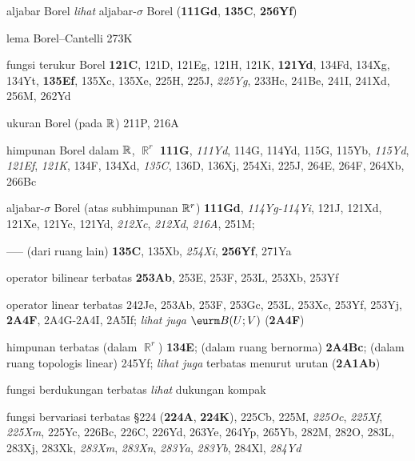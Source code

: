  aljabar Borel {\it lihat} aljabar-$\sigma$ Borel ({\bf 111Gd}, {\bf 135C}, {\bf 256Yf}) 





lema Borel--Cantelli 273K


















fungsi terukur Borel {\bf 121C}, 121D, 121Eg, 121H, 121K, {\bf 121Yd}, 134Fd, 134Xg, 134Yt, {\bf 135Ef}, 135Xc, 135Xe, 225H, 225J, {\it 225Yg}, 233Hc, 241Be, 241I, 241Xd, 256M, 262Yd

ukuran Borel (pada $\Bbb R$) 211P, 216A 






himpunan Borel dalam $\Bbb R$, $\BbbR^r$ {\bf 111G}, {\it 111Yd}, 114G, 114Yd, 115G, 115Yb, {\it 115Yd}, {\it 121Ef}, {\it 121K}, 134F, 134Xd, {\it 135C}, 136D, 136Xj, 254Xi, 225J, 264E, 264F, 264Xb, 266Bc
  






aljabar-$\sigma$ Borel (atas subhimpunan $\Bbb R^r$) {\bf 111Gd}, {\it 114Yg-114Yi}, 121J, 121Xd, 121Xe, 121Yc, 121Yd, {\it 212Xc}, {\it 212Xd}, {\it 216A}, 251M;

----- (dari ruang lain) {\bf 135C}, 135Xb, {\it 254Xi}, {\bf 256Yf}, 271Ya






 operator bilinear terbatas {\bf 253Ab}, 253E, 253F, 253L, 253Xb, 253Yf


operator linear terbatas 242Je, 253Ab, 253F, 253Gc, 253L, 253Xc, 253Yf, 253Yj, {\bf 2A4F}, 2A4G-2A4I, 2A5If; {\it lihat juga} $\eurm B(U;V)$ ({\bf 2A4F})



himpunan terbatas (dalam $\BbbR^r$) {\bf 134E}; (dalam ruang bernorma) {\bf 2A4Bc}; (dalam ruang topologis linear) 245Yf; {\it lihat juga} terbatas menurut urutan ({\bf 2A1Ab})
  

fungsi berdukungan terbatas {\it lihat} dukungan kompak


fungsi bervariasi terbatas \S224 ({\bf 224A}, {\bf 224K}), 225Cb, 225M, {\it 225Oc}, {\it 225Xf}, {\it 225Xm}, 225Yc, 226Bc, 226C, 226Yd, 263Ye, 264Yp, 265Yb, 282M, 282O, 283L, 283Xj, 283Xk, {\it 283Xm}, {\it 283Xn}, {\it 283Ya}, {\it 283Yb}, 284Xl, {\it 284Yd}


